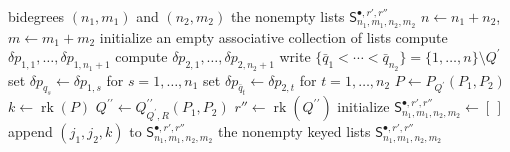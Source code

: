 \documentclass{amsart}
\theoremstyle{definition}
\theoremstyle{remark}
\begin{document}
\begin{algorithm}[ht]
\caption{Placement-rank lists for the ordered shear shuffle}
\label{alg:gamma_shuffle_placement_arrays}
\begin{algorithmic}[1]
\Require bidegrees $(n_1,m_1)$ and $(n_2,m_2)$
\Ensure the nonempty lists
$\mathsf{S}^{\bullet,r',r''}_{n_1,m_1,n_2,m_2}$
\State $n\gets n_1+n_2$, $m\gets m_1+m_2$
\State initialize an empty associative collection of lists
    \State compute
    $\delta p_{1,1},\ldots,\delta p_{1,n_1+1}$
        \State compute
        $\delta p_{2,1},\ldots,\delta p_{2,n_2+1}$
            \State write
            $\{\bar q_1<\cdots<\bar q_{n_2}\}
            =
            \{1,\ldots,n\}\setminus Q^{\prime}$
            \State set
            $\delta p_{q_s}\gets\delta p_{1,s}$
            for $s=1,\ldots,n_1$
            \State set
            $\delta p_{\bar q_t}\gets\delta p_{2,t}$
            for $t=1,\ldots,n_2$
            \State
            $P\gets P_{Q^{\prime}}(P_1,P_2)$
            \State
            $k\gets\operatorname{rk}(P)$
                \State
                $Q^{\prime\prime}
                \gets
                Q^{\prime\prime}_{Q^{\prime},R}(P_1,P_2)$
                \State
                $r''\gets\operatorname{rk}(Q^{\prime\prime})$
                    \State initialize
                    $\mathsf{S}^{\bullet,r',r''}_{n_1,m_1,n_2,m_2}
                    \gets[\,]$
                \EndIf
                \State append $(j_1,j_2,k)$ to
                $\mathsf{S}^{\bullet,r',r''}_{n_1,m_1,n_2,m_2}$
            \EndFor
        \EndFor
    \EndFor
\EndFor
\State \Return the nonempty keyed lists
$\mathsf{S}^{\bullet,r',r''}_{n_1,m_1,n_2,m_2}$
\end{algorithmic}
\end{algorithm}
\end{document}
